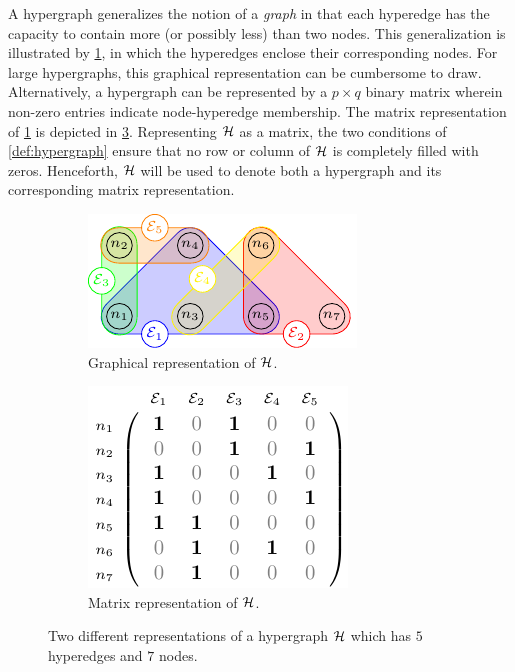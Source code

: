 \documentclass[aps, 10pt, english, twoside, twocolumn, pra, nofootinbib, tightenlines, longbibliography, superscriptaddress]{revtex4-1}
\begin{document}
    A hypergraph generalizes the notion of a \textit{graph} in that each hyperedge has the capacity to contain more (or possibly less) than two nodes. This generalization is illustrated by \cref{fig:hypergraph_diagram_example}, in which the hyperedges enclose their corresponding nodes. For large hypergraphs, this graphical representation can be cumbersome to draw. Alternatively, a hypergraph can be represented by a $p\times q$ binary matrix wherein non-zero entries indicate node-hyperedge membership. The matrix representation of \cref{fig:hypergraph_diagram_example} is depicted in \cref{fig:hypergraph_matrix_example}. Representing $\mathcal{H}$ as a matrix, the two conditions of \cref{def:hypergraph} ensure that no row or column of $\mathcal{H}$ is completely filled with zeros. Henceforth, $\mathcal{H}$ will be used to denote both a hypergraph and its corresponding matrix representation.
    \begin{figure}
    \begin{subfigure}{\linewidth}
        \includegraphics[width=\linewidth]{figures/hypergraph_diagram_1_standalone/figure.pdf}
        \caption{Graphical representation of $\mathcal{H}$.}
        \label{fig:hypergraph_diagram_example}
    \end{subfigure}
    \begin{subfigure}{0.8\linewidth}
        \includegraphics[width=0.8\linewidth]{figures/hypergraph_matrix_1_standalone/figure.pdf}
        \caption{Matrix representation of $\mathcal{H}$.}
        \label{fig:hypergraph_matrix_example}
    \end{subfigure}
    \caption{Two different representations of a hypergraph $\mathcal{H}$ which has $5$ hyperedges and $7$ nodes.}
    \end{figure}
\end{document}

